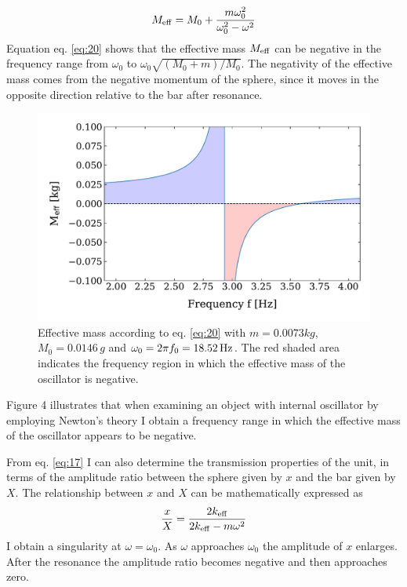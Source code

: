 \documentclass[12pt]{article}
\begin{document}
\begin{equation}\label{eq:20}
 M_{\rm eff} =	M_0 + \frac{m \omega_0^2}{\omega_0^2 -\omega ^2}
\end{equation} 
Equation eq. \ref{eq:20} shows that the effective mass $M_{\rm eff}$ can be negative in the frequency range from $\omega_0$ to $\omega_0 \sqrt{(M_0 + m)/ M_0}.$ The negativity of the effective mass comes from the negative momentum of the sphere, since it moves in the opposite direction relative to the bar after resonance. 
\begin{figure}[hbt]
  \includegraphics[width=0.7\columnwidth]{effective_mass.pdf}
  \caption{Effective mass according to eq. \ref{eq:20} with $m=0.0073 kg$, $M_{0}=0.0146\, g$ and $\omega_0=2\pi f_{0}=18.52\,{\rm Hz}$. The red shaded area indicates the frequency region in which the effective mass of the oscillator is negative.}
\end{figure}
Figure 4 illustrates that when examining an object with internal oscillator by employing Newton's theory I obtain a frequency range in which the effective mass of the oscillator appears to be negative.

    From eq. \ref{eq:17} I can also determine the transmission properties of the unit, in terms of the amplitude ratio between the sphere given by $x$ and the bar given by $X$. The relationship between $x$ and $X$ can be mathematically expressed as
    \begin{equation} \label{eq:ratio}
        \frac{x}{X} = \frac{2k_{\rm eff}}{2k_{\rm eff} - m\omega^2}
    \end{equation}
I obtain a singularity at $\omega = \omega_0$. As $\omega$ approaches $\omega_0$ the amplitude of $x$ enlarges. After the resonance the amplitude ratio becomes negative and then approaches zero. 
\end{document}
